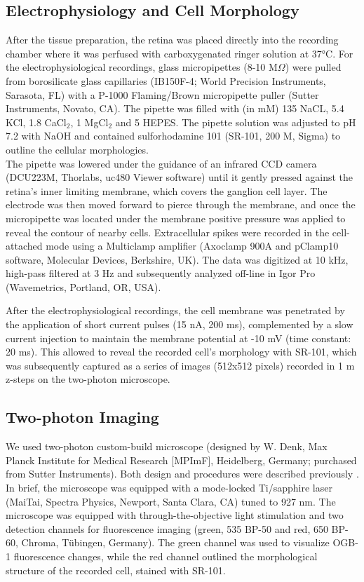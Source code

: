 \subsection{Electrophysiology and Cell Morphology}
After the tissue preparation, the retina was placed directly into the recording chamber where it was perfused with carboxygenated ringer solution at 37°C. For the electrophysiological recordings, glass micropipettes (8-10 M$\Omega$) were pulled from borosilicate glass capillaries (IB150F-4; World Precision Instruments, Sarasota, FL) with a P-1000 Flaming/Brown micropipette puller (Sutter Instruments, Novato, CA). The pipette was filled with (in mM) 135 NaCL, 5.4 KCl, 1.8 CaCl$_{2}$, 1 MgCl$_{2}$ and 5 HEPES. The pipette solution was adjusted to pH 7.2 with NaOH and contained sulforhodamine 101 (SR-101, 200 \textmu M, Sigma) to outline the cellular morphologies.\\
The pipette was lowered under the guidance of an infrared CCD camera (DCU223M, Thorlabs, uc480 Viewer software) until it gently pressed against the retina’s inner limiting membrane, which covers the ganglion cell layer. The electrode was then moved forward to pierce through the membrane, and once the micropipette was located under the membrane positive pressure was applied to reveal the contour of nearby cells. Extracellular spikes were recorded in the cell-attached mode using a Multiclamp amplifier (Axoclamp 900A and pClamp10 software, Molecular Devices, Berkshire, UK). The data was digitized at 10 kHz, high-pass filtered at 3 Hz and subsequently analyzed off-line in Igor Pro (Wavemetrics, Portland, OR, USA). 

After the electrophysiological recordings, the cell membrane was penetrated by the application of short current pulses (15 nA, 200 ms), complemented by a slow current injection to maintain the membrane potential at -10 mV (time constant: 20 ms). This allowed to reveal the recorded cell’s morphology with SR-101, which was subsequently captured as a series of images (512x512 pixels) recorded in 1 \textmu m z-steps on the two-photon microscope.

\subsection{Two-photon Imaging}
We used two-photon custom-build microscope (designed by W. Denk, Max Planck Institute for Medical Research [MPImF], Heidelberg, Germany; purchased from Sutter Instruments). Both design and procedures were described previously \citep{euler09, baden13}. In brief, the microscope was equipped with a mode-locked Ti/sapphire laser (MaiTai, Spectra Physics, Newport, Santa Clara, CA) tuned to 927 nm. The microscope was equipped with through-the-objective light stimulation and two detection channels for fluorescence imaging (green, 535 BP-50 and red, 650 BP-60, Chroma, Tübingen, Germany). The green channel was used to visualize OGB-1 fluorescence changes, while the red channel outlined the morphological structure of the recorded cell, stained with SR-101. 


